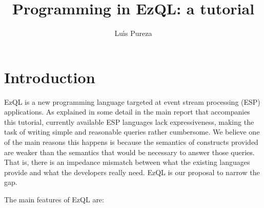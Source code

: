 \documentclass{report}
\begin{document}
\title{Programming in EzQL: a tutorial}
\author{Lu\'{\i}s Pureza}

\maketitle

\tableofcontents

\addtolength{\parskip}{\baselineskip}
\chapter{Introduction}
\label{chap:introduction}
EzQL is a new programming language targeted at event stream processing
(ESP) applications. As explained in some detail in the main report
that accompanies this tutorial, currently available ESP languages lack
expressiveness, making the task of writing simple and reasonable
queries rather cumbersome. We believe one of the main reasons this
happens is because the semantics of constructs provided are weaker
than the semantics that would be necessary to answer those
queries. That is, there is an impedance mismatch between what the
existing languages provide and what the developers really need. EzQL
is our proposal to narrow the gap.

The main features of EzQL are:
\end{document}
